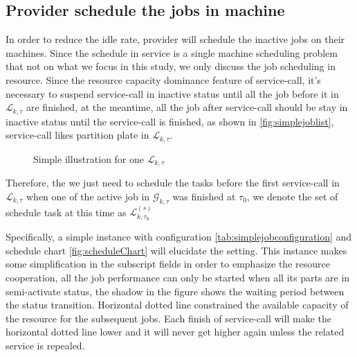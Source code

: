 \subsection{Provider schedule the jobs in machine} %
\label{sub:schedule_the_jobs_in_machine}
In order to reduce the idle rate, provider will schedule the inactive jobs on their machines. Since the schedule in service is a single machine scheduling problem that not on  what we focus in this study, we only discuss the job scheduling in resource. Since the  resource capacity dominance feature of service-call, it's necessary to suspend service-call in inactive status until all the job before it in $\mathcal{L}_{k,\tau}$ are finished, at the meantime, all the job after service-call should be stay in inactive status until the service-call is finished, as shown in \autoref{fig:simplejoblist}, service-call likes partition plate in $\mathcal{L}_{k,\tau}$.  
\begin{figure}[htbp]
	\centering
	\resizebox{.7\textwidth}{!}{}
	\caption{Simple illustration for one $\mathcal{L}_{k,\tau}$}
	\label{fig:simplejoblist}
\end{figure}
Therefore, the we just need to schedule the tasks before the first service-call in $\mathcal{L}_{k,\tau}$ when one of the active job in $\mathcal{G}_{k,\tau}$ was finished at $\tau_0$, we denote the set of schedule task at this time as $\mathcal{L}^{(s)}_{k,\tau_0}$

Specifically, a simple instance with configuration \autoref{tab:simplejobconfiguration} and schedule chart \autoref{fig:scheduleChart} will elucidate the setting.
This instance makes some simplification in the subscript fields in order to emphasize the resource cooperation, all the job performance can only be started when all its parts are in semi-activate status, the shadow in the figure shows the waiting period between the status transition. Horizontal dotted line constrained the available capacity of the resource for the subsequent jobs. Each finish of service-call will make the horizontal dotted line lower and it will never get higher again unless the related service is repealed.

